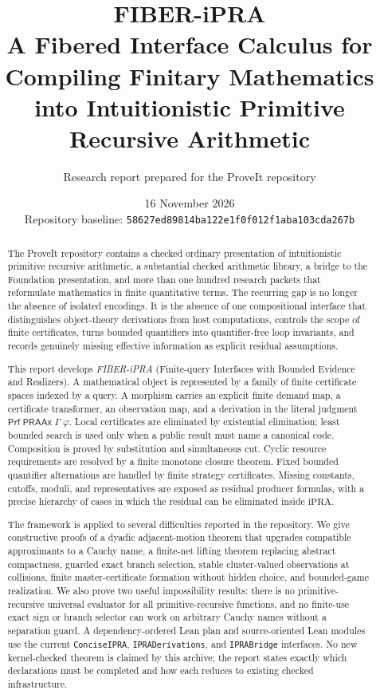 \documentclass[11pt]{article}
\title{\textbf{FIBER-iPRA}\\[3pt]
\large A Fibered Interface Calculus for Compiling Finitary Mathematics into Intuitionistic Primitive Recursive Arithmetic}
\author{Research report prepared for the ProveIt repository}
\date{16 November 2026\\Repository baseline: \texttt{58627ed89814ba122e1f0f012f1aba103cda267b}}
\theoremstyle{remark}
\newcommand{\ipra}{\mathrm{iPRA}}
\newcommand{\PRAAx}{\mathsf{PRAAx}}
\newcommand{\Prf}{\mathsf{Prf}}
\begin{document}
\maketitle

\begin{abstract}
The ProveIt repository contains a checked ordinary presentation of intuitionistic primitive recursive arithmetic, a substantial checked arithmetic library, a bridge to the Foundation presentation, and more than one hundred research packets that reformulate mathematics in finite quantitative terms.  The recurring gap is no longer the absence of isolated encodings.  It is the absence of one compositional interface that distinguishes object-theory derivations from host computations, controls the scope of finite certificates, turns bounded quantifiers into quantifier-free loop invariants, and records genuinely missing effective information as explicit residual assumptions.

This report develops \emph{FIBER-iPRA} (Finite-query Interfaces with Bounded Evidence and Realizers).  A mathematical object is represented by a family of finite certificate spaces indexed by a query.  A morphism carries an explicit finite demand map, a certificate transformer, an observation map, and a derivation in the literal judgment \(\Prf\;\PRAAx\;\Gamma\;\varphi\).  Local certificates are eliminated by existential elimination; least bounded search is used only when a public result must name a canonical code.  Composition is proved by substitution and simultaneous cut.  Cyclic resource requirements are resolved by a finite monotone closure theorem.  Fixed bounded quantifier alternations are handled by finite strategy certificates.  Missing constants, cutoffs, moduli, and representatives are exposed as residual producer formulas, with a precise hierarchy of cases in which the residual can be eliminated inside \(\ipra\).

The framework is applied to several difficulties reported in the repository.  We give constructive proofs of a dyadic adjacent-motion theorem that upgrades compatible approximants to a Cauchy name, a finite-net lifting theorem replacing abstract compactness, guarded exact branch selection, stable cluster-valued observations at collisions, finite master-certificate formation without hidden choice, and bounded-game realization.  We also prove two useful impossibility results: there is no primitive-recursive universal evaluator for all primitive-recursive functions, and no finite-use exact sign or branch selector can work on arbitrary Cauchy names without a separation guard.  A dependency-ordered Lean plan and source-oriented Lean modules use the current \texttt{ConciseIPRA}, \texttt{IPRADerivations}, and \texttt{IPRABridge} interfaces.  No new kernel-checked theorem is claimed by this archive; the report states exactly which declarations must be completed and how each reduces to existing checked infrastructure.
\end{abstract}
\end{document}
